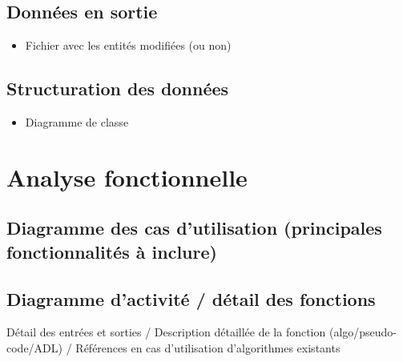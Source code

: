 \subsection{Données en sortie}

\begin{itemize}
	\item Fichier avec les entités modifiées (ou non)
\end{itemize}

\subsection{Structuration des données}

\begin{itemize}
	\item Diagramme de classe
\end{itemize}



\section{Analyse fonctionnelle}

\subsection{Diagramme des cas d'utilisation (principales fonctionnalités à inclure)}

\subsection{Diagramme d'activité / détail des fonctions}

Détail des entrées et sorties / Description détaillée de la fonction (algo/pseudo-code/ADL) / Références en cas d'utilisation d'algorithmes existants\newline

